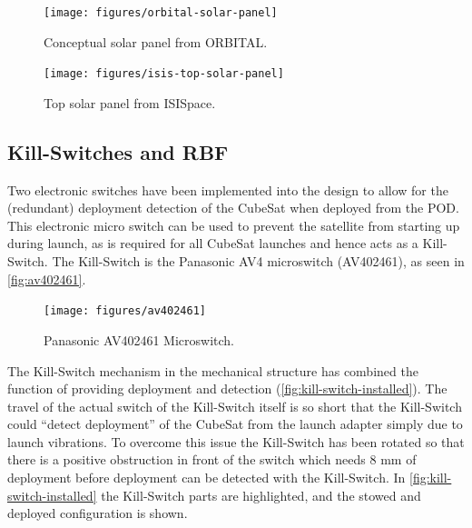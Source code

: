 \begin{figure}[!ht]
    \begin{center}
        \texttt{[image: figures/orbital-solar-panel]}
        \caption{Conceptual solar panel from ORBITAL.}
        \label{fig:solar-panel-orbital}
    \end{center}
\end{figure}

\begin{figure}[!ht]
    \begin{center}
        \texttt{[image: figures/isis-top-solar-panel]}
        \caption{Top solar panel from ISISpace.}
        \label{fig:top-solar-panel}
    \end{center}
\end{figure}

\subsection{Kill-Switches and RBF}

Two electronic switches have been implemented into the design to allow for the (redundant) deployment detection of the CubeSat when deployed from the POD. This electronic micro switch can be used to prevent the satellite from starting up during launch, as is required for all CubeSat launches and hence acts as a Kill-Switch. The Kill-Switch is the Panasonic AV4 microswitch (AV402461), as seen in \autoref{fig:av402461}.

\begin{figure}[!ht]
    \begin{center}
        \texttt{[image: figures/av402461]}
        \caption{Panasonic AV402461 Microswitch.}
        \label{fig:av402461}
    \end{center}
\end{figure}

The Kill-Switch mechanism in the mechanical structure has combined the function of providing deployment and detection (\autoref{fig:kill-switch-installed}). The travel of the actual switch of the Kill-Switch itself is so short that the Kill-Switch could ``detect deployment'' of the CubeSat from the launch adapter simply due to launch vibrations. To overcome this issue the Kill-Switch has been rotated so that there is a positive obstruction in front of the switch which needs 8 mm of deployment before deployment can be detected with the Kill-Switch. In \autoref{fig:kill-switch-installed} the Kill-Switch parts are highlighted, and the stowed and deployed configuration is shown.


